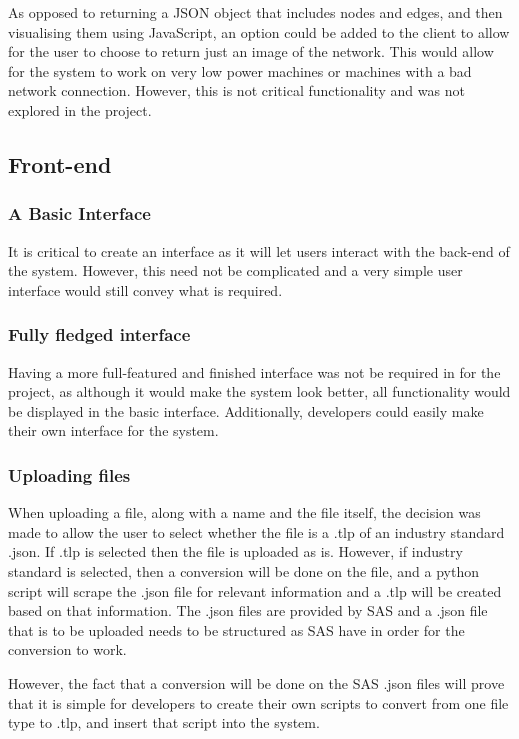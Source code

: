 \documentclass[../dissertation.tex]{subfiles}
\begin{document}
As opposed to returning a JSON object that includes nodes and edges, and then visualising them using JavaScript, an option could be added to the client to allow for the user to choose to return just an image of the network. This would allow for the system to work on very low power machines or machines with a bad network connection. However, this is not critical functionality and was not explored in the project.

\subsection{Front-end}

\subsubsection{A Basic Interface}

It is critical to create an interface as it will let users interact with the back-end of the system. However, this need not be complicated and a very simple user interface would still convey what is required.

\subsubsection{Fully fledged interface}

Having a more full-featured and finished interface was not be required in for the project, as although it would make the system look better, all functionality would be displayed in the basic interface. Additionally, developers could easily make their own interface for the system.

\subsubsection{Uploading files}

When uploading a file, along with a name and the file itself, the decision was made to allow the user to select whether the file is a .tlp of an industry standard .json. If .tlp is selected then the file is uploaded as is. However, if industry standard is selected, then a conversion will be done on the file, and a python script will scrape the .json file for relevant information and a .tlp will be created based on that information. The .json files are provided by SAS and a .json file that is to be uploaded needs to be structured as SAS have in order for the conversion to work. 

However, the fact that a conversion will be done on the SAS .json files will prove that it is simple for developers to create their own scripts to convert from one file type to .tlp, and insert that script into the system.
\end{document}
